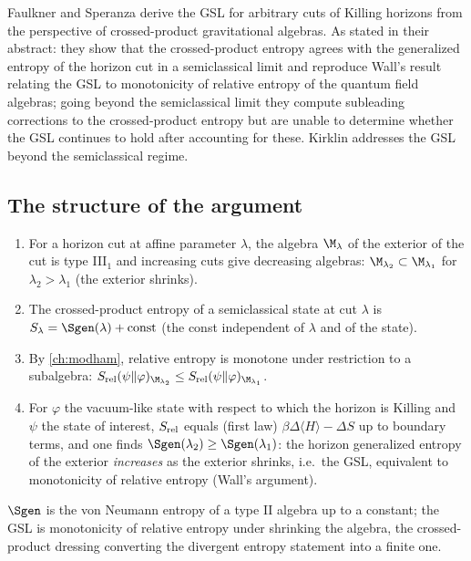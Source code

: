 Faulkner and Speranza \cite{FaulknerSperanza2024} derive the GSL for arbitrary cuts of Killing horizons from the perspective of crossed-product gravitational algebras. As stated in their abstract: they show that the crossed-product entropy agrees with the generalized entropy of the horizon cut in a semiclassical limit and reproduce Wall's result relating the GSL to monotonicity of relative entropy of the quantum field algebras; going beyond the semiclassical limit they compute subleading corrections to the crossed-product entropy but are unable to determine whether the GSL continues to hold after accounting for these. Kirklin \cite{Kirklin2024GSL} addresses the GSL beyond the semiclassical regime.

\subsection*{The structure of the argument}
\begin{enumerate}
\item For a horizon cut at affine parameter $\lambda$, the algebra $\M_\lambda$ of the exterior of the cut is type III$_1$ and increasing cuts give decreasing algebras: $\M_{\lambda_2}\subset\M_{\lambda_1}$ for $\lambda_2>\lambda_1$ (the exterior shrinks).
\item The crossed-product entropy of a semiclassical state at cut $\lambda$ is $S_\lambda=\Sgen(\lambda)+\text{const}$ (the const independent of $\lambda$ and of the state).
\item By \cref{ch:modham}, relative entropy is monotone under restriction to a subalgebra: $S_{\rm rel}(\psi\|\varphi)_{\M_{\lambda_2}}\le S_{\rm rel}(\psi\|\varphi)_{\M_{\lambda_1}}$.
\item For $\varphi$ the vacuum-like state with respect to which the horizon is Killing and $\psi$ the state of interest, $S_{\rm rel}$ equals (first law) $\beta\Delta\langle H\rangle-\Delta S$ up to boundary terms, and one finds $\Sgen(\lambda_2)\ge\Sgen(\lambda_1)$: the horizon generalized entropy of the exterior \emph{increases} as the exterior shrinks, i.e.\ the GSL, equivalent to monotonicity of relative entropy (Wall's argument).
\end{enumerate}

\begin{keyidea}
$\Sgen$ is the von Neumann entropy of a type II algebra up to a constant; the GSL is monotonicity of relative entropy under shrinking the algebra, the crossed-product dressing converting the divergent entropy statement into a finite one.
\end{keyidea}

